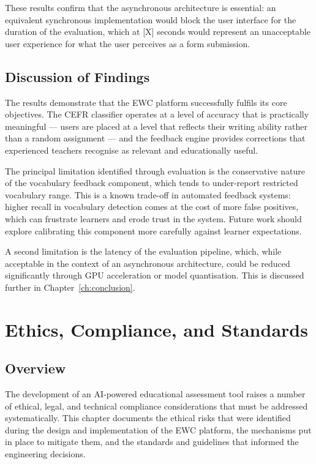 \documentclass[12pt, a4paper]{report}
\begin{document}
These results confirm that the asynchronous architecture is essential: an equivalent synchronous implementation would block the user interface for the duration of the evaluation, which at [X] seconds would represent an unacceptable user experience for what the user perceives as a form submission.

\section{Discussion of Findings}

The results demonstrate that the EWC platform successfully fulfils its core objectives. The CEFR classifier operates at a level of accuracy that is practically meaningful — users are placed at a level that reflects their writing ability rather than a random assignment — and the feedback engine provides corrections that experienced teachers recognise as relevant and educationally useful.

The principal limitation identified through evaluation is the conservative nature of the vocabulary feedback component, which tends to under-report restricted vocabulary range. This is a known trade-off in automated feedback systems: higher recall in vocabulary detection comes at the cost of more false positives, which can frustrate learners and erode trust in the system. Future work should explore calibrating this component more carefully against learner expectations.

A second limitation is the latency of the evaluation pipeline, which, while acceptable in the context of an asynchronous architecture, could be reduced significantly through GPU acceleration or model quantisation. This is discussed further in Chapter~\ref{ch:conclusion}.

\chapter{Ethics, Compliance, and Standards}
\label{ch:ethics}

\section{Overview}

The development of an AI-powered educational assessment tool raises a number of ethical, legal, and technical compliance considerations that must be addressed systematically. This chapter documents the ethical risks that were identified during the design and implementation of the EWC platform, the mechanisms put in place to mitigate them, and the standards and guidelines that informed the engineering decisions.
\end{document}
